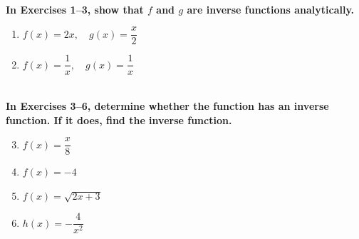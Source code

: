 \begin{exercise}
    ~\\\-\hspace{0.3cm} \textbf{
        In Exercises 1–3, show that $f$ and $g$ are inverse functions analytically.
    }\cite{ci}\\
    \begin{enumerate} 
		\item $f(x) = 2x,\quad g(x)=\dfrac{x}{2}$
		\item $f(x) = \dfrac{1}{x},\quad g(x)=\dfrac{1}{x}$
    \end{enumerate}
    ~\\\-\hspace{0.3cm} \textbf{
        In Exercises 3–6, determine whether the function has an inverse function. If it does, find the inverse function.
    }\cite{ci}\\
    \begin{enumerate}
        \setcounter{enumi}{2}
        \item $f(x) = \dfrac{x}{8}$
        \item $f(x) = -4$
        \item $f(x) = \sqrt{2x+3}$
        \item $h(x) = -\dfrac{4}{x^2}$
    \end{enumerate}
\end{exercise}
